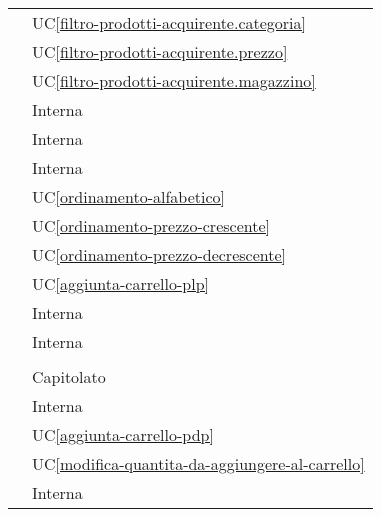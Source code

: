 \begin{longtable}{C{6cm} C{6cm}}
     & UC\ref{filtro-prodotti-acquirente.categoria} \\

     & UC\ref{filtro-prodotti-acquirente.prezzo} \\

     & UC\ref{filtro-prodotti-acquirente.magazzino} \\

     & Interna \\

     & Interna \\

     & Interna \\

     & UC\ref{ordinamento-alfabetico} \\

     & UC\ref{ordinamento-prezzo-crescente} \\

     & UC\ref{ordinamento-prezzo-decrescente} \\

     & UC\ref{aggiunta-carrello-plp} \\

     & Interna \\

     & Interna \\

     &  \\

     & Capitolato \\

     & Interna \\

     & UC\ref{aggiunta-carrello-pdp} \\

     & UC\ref{modifica-quantita-da-aggiungere-al-carrello} \\

     & Interna \\


\end{longtable}
